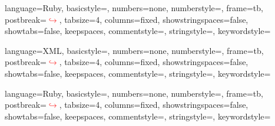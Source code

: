  {
	language=Ruby,		%
	basicstyle=\footnotesize\ttfamily,
	numbers=none,
	numberstyle=\tiny{},
	frame=tb,
	postbreak=\mbox{\textcolor{red}{$\hookrightarrow$}\space},
	tabsize=4,
	columns=fixed,
	showstringspaces=false,
	showtabs=false,
	keepspaces,
	commentstyle=\color{red},
	stringstyle=\color{gray},		%
	keywordstyle=\color{blue}
}

 {
	language=XML,		%
	basicstyle=\footnotesize\ttfamily,
	numbers=none,
	numberstyle=\tiny{},
	frame=tb,
	postbreak=\mbox{\textcolor{red}{$\hookrightarrow$}\space},
	tabsize=4,
	columns=fixed,
	showstringspaces=false,
	showtabs=false,
	keepspaces,
	commentstyle=\color{red},
	stringstyle=\color{gray},		%
	keywordstyle=\color{blue}
}

 {
	language=Ruby,
	basicstyle=\scriptsize\ttfamily,
	numbers=none,
	numberstyle=\tiny{},
	frame=tb,
	postbreak=\mbox{\textcolor{red}{$\hookrightarrow$}\space},
	tabsize=4,
	columns=fixed,
	showstringspaces=false,
	showtabs=false,
	keepspaces,
	commentstyle=\color{black},
	stringstyle=\color{black},
	keywordstyle=\color{black}
}











